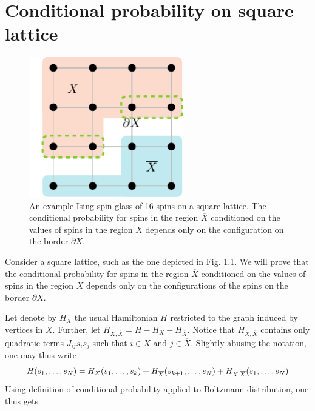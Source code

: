 \chapter{Conditional probability on square lattice}
\label{sec:probability}
\begin{figure}
  \centering
  \includegraphics[width=0.6\textwidth]{figures/latticeonly}
  \caption{An example Ising spin-glass of 16 spins on a square lattice. The conditional
    probability for spins in the region $\overline{X}$ conditioned on the values of spins in the
    region $X$ depends only on the configuration on the border $\partial X$.}
  \label{fig:lattice}
\end{figure}

Consider a square lattice, such as the one depicted in Fig. \ref{fig:lattice}.
We will prove that the conditional probability for spins in the region $\overline{X}$
conditioned on the values of spins in the region $X$ depends only on the configurations of the spins on the
border $\partial X$.

Let denote by $H_X$ the usual Hamiltonian $H$ restricted to the graph
induced by vertices in $X$. Further, let $H_{X, \overline{X}} = H - H_X -
  H_{\overline{X}}$. Notice that $H_{X, \overline{X}}$ contains only quadratic
terms $J_{ij} s_i s_j$ such that $i \in X$ and $j \in \overline{X}$. Slightly
abusing the notation, one may thus write
\begin{equation}
  \small
  H(s_1, \ldots, s_N) = H_X(s_1, \ldots, s_k) + H_{\overline{X}}(s_{k+1}, \ldots, s_N) + H_{X, \overline{X}}(s_1, \ldots, s_N)
\end{equation}
Using definition of conditional probability applied to Boltzmann distribution,
one thus gets

